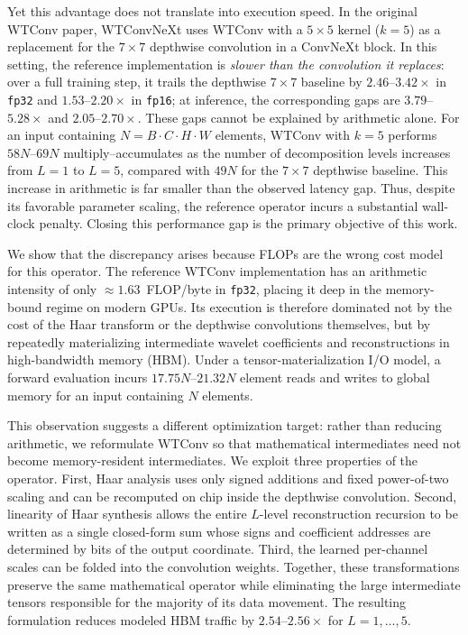 \documentclass[10pt]{article} %
\theoremstyle{plain}
\begin{document}
Yet this advantage does not translate into execution speed. In the original WTConv paper, WTConvNeXt uses WTConv with a $5\times5$ kernel ($k{=}5$) as a replacement for the $7\times7$ depthwise convolution in a ConvNeXt block. In this setting, the reference implementation is \emph{slower than the convolution it replaces}: over a full training step, it trails the depthwise $7\times7$ baseline by $2.46$--$3.42\times$ in \texttt{fp32} and $1.53$--$2.20\times$ in \texttt{fp16}; at inference, the corresponding gaps are $3.79$--$5.28\times$ and $2.05$--$2.70\times$. These gaps cannot be explained by arithmetic alone. For an input containing $N=B\cdot C\cdot H\cdot W$ elements, WTConv with $k{=}5$ performs $58N$--$69N$ multiply--accumulates as the number of decomposition levels increases from $L{=}1$ to $L{=}5$, compared with $49N$ for the $7\times7$ depthwise baseline. This increase in arithmetic is far smaller than the observed latency gap. Thus, despite its favorable parameter scaling, the reference operator incurs a substantial wall-clock penalty. Closing this performance gap is the primary objective of this work.



We show that the discrepancy arises because FLOPs are the wrong cost model for this operator. The reference WTConv implementation has an arithmetic intensity of only $\approx1.63$~FLOP/byte in \texttt{fp32}, placing it deep in the memory-bound regime on modern GPUs. Its execution is therefore dominated not by the cost of the Haar transform or the depthwise convolutions themselves, but by repeatedly materializing intermediate wavelet coefficients and reconstructions in high-bandwidth memory (HBM). Under a tensor-materialization I/O model, a forward evaluation incurs $17.75N$--$21.32N$ element reads and writes to global memory for an input containing $N$ elements.

This observation suggests a different optimization target: rather than reducing arithmetic, we reformulate WTConv so that mathematical intermediates need not become memory-resident intermediates. We exploit three properties of the operator. First, Haar analysis uses only signed additions and fixed power-of-two scaling and can be recomputed on chip inside the depthwise convolution. Second, linearity of Haar synthesis allows the entire $L$-level reconstruction recursion to be written as a single closed-form sum whose signs and coefficient addresses are determined by bits of the output coordinate. Third, the learned per-channel scales can be folded into the convolution weights. Together, these transformations preserve the same mathematical operator while eliminating the large intermediate tensors responsible for the majority of its data movement. The resulting formulation reduces modeled HBM traffic by $2.54$--$2.56\times$ for $L=1,\ldots,5$.
\end{document}
